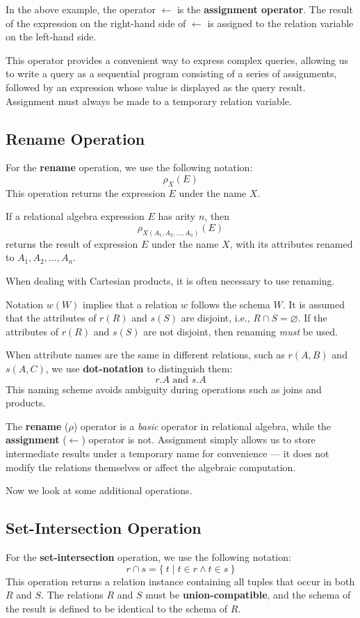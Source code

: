 In the above example, the operator \(\leftarrow\) is the \textbf{assignment operator}. The result of the expression on the right-hand side of \(\leftarrow\) is assigned to the relation variable on the left-hand side. 

This operator provides a convenient way to express complex queries, allowing us to write a query as a sequential program consisting of a series of assignments, followed by an expression whose value is displayed as the query result. Assignment must always be made to a temporary relation variable.

\subsection{Rename Operation}
For the \textbf{rename} operation, we use the following notation:
\[
  \rho_X(E)
\]
This operation returns the expression \(E\) under the name \(X\).

If a relational algebra expression \(E\) has arity \(n\), then
\[
  \rho_{X(A_1, A_2, \dots, A_n)}(E)
\]
returns the result of expression \(E\) under the name \(X\), with its attributes renamed to \(A_1, A_2, \dots, A_n\).

When dealing with Cartesian products, it is often necessary to use renaming. 

Notation \(w(W)\) implies that a relation \(w\) follows the schema \(W\). It is assumed that the attributes of \(r(R)\) and \(s(S)\) are disjoint, i.e., \(R \cap S = \varnothing\). If the attributes of \(r(R)\) and \(s(S)\) are not disjoint, then renaming \emph{must} be used.

When attribute names are the same in different relations, such as \(r(A, B)\) and \(s(A, C)\), we use \textbf{dot-notation} to distinguish them:
\[
  r.A \text{ and } s.A
\]
This naming scheme avoids ambiguity during operations such as joins and products.

\begin{remark}
  The \textbf{rename} (\(\rho\)) operator is a \emph{basic} operator in relational algebra, while the \textbf{assignment} (\(\leftarrow\)) operator is not. 
  Assignment simply allows us to store intermediate results under a temporary name for convenience — it does not modify the relations themselves or affect the algebraic computation.
\end{remark}

Now we look at some additional operations. 

\subsection{Set-Intersection Operation}
For the \textbf{set-intersection} operation, we use the following notation: 
\[
  r \cap s = \{\ t \mid t \in r \land t \in s\ \}
\]
This operation returns a relation instance containing all tuples that occur in both \(R\) and \(S\). The relations \(R\) and \(S\) must be \textbf{union-compatible}, and the schema of the result is defined to be identical to the schema of \(R\).


